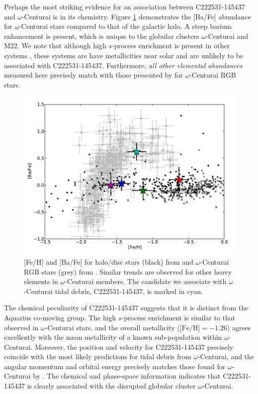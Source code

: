\documentclass{emulateapj}
\begin{document}

Perhaps the most striking evidence for an association between {C222531-145437} and $\omega$-Centurai is in its chemistry. Figure \ref{fig:omega-cen-barium} demonstrates the [Ba/Fe] abundance for $\omega$-Centurai stars compared to that of the galactic halo. A steep barium enhancement is present, which is unique to the globular clusters $\omega$-Centurai and M22. We note that although high $s$-process enrichment is present in other systems \citep[IC 2391, the Argus association;][]{de_silva;et-al_2013}, these systems are have metallicities near solar and are unlikely to be associated with {C222531-145437}. Furthermore, \textit{all other elemental abundances} measured here precisely match with those presented by \citet{marino;et-al_2011} for $\omega$-Centurai RGB stars.

\begin{figure}[h!]
	\includegraphics[width=\columnwidth]{./figures/omegaCen-c222531.pdf}
	\caption{[Fe/H] and [Ba/Fe] for halo/disc stars (black) from \citet{fulbright_2000,reddy;et-al_2003,reddy;et-al_2006} and $\omega$-Centurai RGB stars (grey) from \citet{francois;et-al_1988,smith;et-al_2000,marino;et-al_2011}. Similar trends are observed for other heavy elements in $\omega$-Centurai members. The candidate we associate with $\omega$-Centurai tidal debris, C222531-145437, is marked in cyan.}
	\label{fig:omega-cen-barium}
\end{figure}


The chemical peculiarity of {C222531-145437} suggests that it is distinct from the Aquarius co-moving group. The high $s$-process enrichment is similar to that observed in $\omega$-Centurai stars, and the overall metallicity {($\mbox{[Fe/H]} = -1.26$)} agrees excellently with the mean metallicity of a known sub-population within $\omega$-Centurai. Moreover, the position and velocity for {C222531-145437} precisely coincide with the most likely predictions for tidal debris from $\omega$-Centurai, and the angular momentum and orbital energy precisely matches those found for $\omega$-Centurai by \citet{dinescu;et-al_1999}. The chemical and phase-space information indicates that {C222531-145437} is clearly associated with the disrupted globular cluster $\omega$-Centurai.
\end{document}
